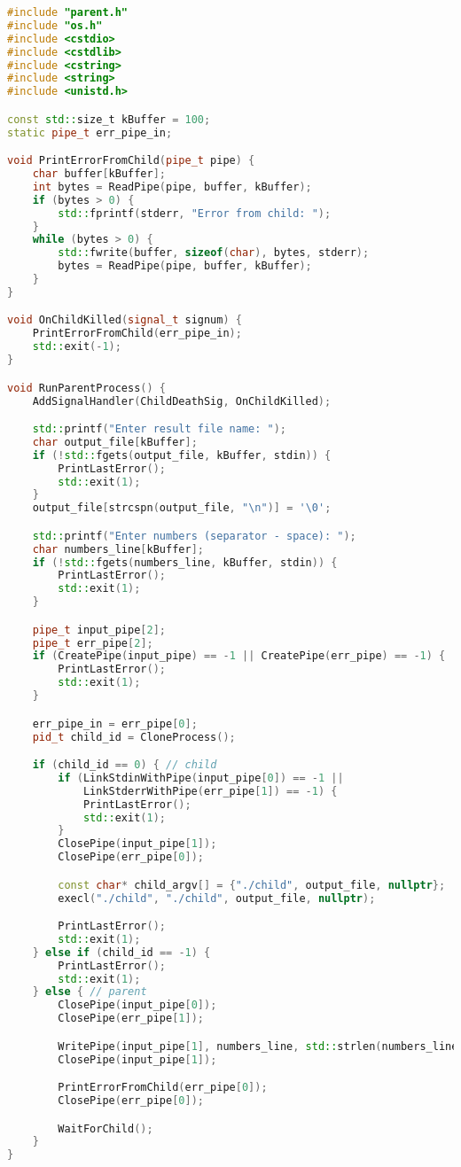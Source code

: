 \begin{lstlisting}[language=C++,caption=parent.cpp,captionpos=b]
#include "parent.h"
#include "os.h"
#include <cstdio>
#include <cstdlib>
#include <cstring>
#include <string>
#include <unistd.h>

const std::size_t kBuffer = 100;
static pipe_t err_pipe_in;

void PrintErrorFromChild(pipe_t pipe) {
    char buffer[kBuffer];
    int bytes = ReadPipe(pipe, buffer, kBuffer);
    if (bytes > 0) {
        std::fprintf(stderr, "Error from child: ");
    }
    while (bytes > 0) {
        std::fwrite(buffer, sizeof(char), bytes, stderr);
        bytes = ReadPipe(pipe, buffer, kBuffer);
    }
}

void OnChildKilled(signal_t signum) {
    PrintErrorFromChild(err_pipe_in);
    std::exit(-1);
}

void RunParentProcess() {
    AddSignalHandler(ChildDeathSig, OnChildKilled);

    std::printf("Enter result file name: ");
    char output_file[kBuffer];
    if (!std::fgets(output_file, kBuffer, stdin)) {
        PrintLastError();
        std::exit(1);
    }
    output_file[strcspn(output_file, "\n")] = '\0';

    std::printf("Enter numbers (separator - space): ");
    char numbers_line[kBuffer];
    if (!std::fgets(numbers_line, kBuffer, stdin)) {
        PrintLastError();
        std::exit(1);
    }

    pipe_t input_pipe[2];
    pipe_t err_pipe[2];
    if (CreatePipe(input_pipe) == -1 || CreatePipe(err_pipe) == -1) {
        PrintLastError();
        std::exit(1);
    }

    err_pipe_in = err_pipe[0];
    pid_t child_id = CloneProcess();

    if (child_id == 0) { // child
        if (LinkStdinWithPipe(input_pipe[0]) == -1 ||
            LinkStderrWithPipe(err_pipe[1]) == -1) {
            PrintLastError();
            std::exit(1);
        }
        ClosePipe(input_pipe[1]);
        ClosePipe(err_pipe[0]);

        const char* child_argv[] = {"./child", output_file, nullptr};
        execl("./child", "./child", output_file, nullptr);

        PrintLastError();
        std::exit(1);
    } else if (child_id == -1) {
        PrintLastError();
        std::exit(1);
    } else { // parent
        ClosePipe(input_pipe[0]);
        ClosePipe(err_pipe[1]);

        WritePipe(input_pipe[1], numbers_line, std::strlen(numbers_line));
        ClosePipe(input_pipe[1]);

        PrintErrorFromChild(err_pipe[0]);
        ClosePipe(err_pipe[0]);

        WaitForChild();
    }
}
\end{lstlisting}

